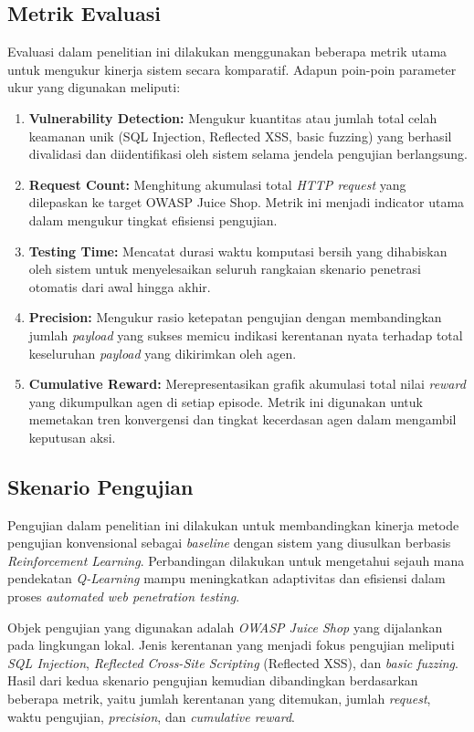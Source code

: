 \subsection{Metrik Evaluasi}

Evaluasi dalam penelitian ini dilakukan menggunakan beberapa metrik utama untuk mengukur kinerja sistem secara komparatif. Adapun poin-poin parameter ukur yang digunakan meliputi:

\begin{enumerate}
    \item \textbf{Vulnerability Detection:} Mengukur kuantitas atau jumlah total celah keamanan unik (SQL Injection, Reflected XSS, basic fuzzing) yang berhasil divalidasi dan diidentifikasi oleh sistem selama jendela pengujian berlangsung.
    \item \textbf{Request Count:} Menghitung akumulasi total \textit{HTTP request} yang dilepaskan ke target OWASP Juice Shop. Metrik ini menjadi indicator utama dalam mengukur tingkat efisiensi pengujian.
    \item \textbf{Testing Time:} Mencatat durasi waktu komputasi bersih yang dihabiskan oleh sistem untuk menyelesaikan seluruh rangkaian skenario penetrasi otomatis dari awal hingga akhir.
    \item \textbf{Precision:} Mengukur rasio ketepatan pengujian dengan membandingkan jumlah \textit{payload} yang sukses memicu indikasi kerentanan nyata terhadap total keseluruhan \textit{payload} yang dikirimkan oleh agen.
    \item \textbf{Cumulative Reward:} Merepresentasikan grafik akumulasi total nilai \textit{reward} yang dikumpulkan agen di setiap episode. Metrik ini digunakan untuk memetakan tren konvergensi dan tingkat kecerdasan agen dalam mengambil keputusan aksi.
\end{enumerate}

\subsection{Skenario Pengujian}

Pengujian dalam penelitian ini dilakukan untuk membandingkan kinerja metode pengujian konvensional sebagai \textit{baseline} dengan sistem yang diusulkan berbasis \textit{Reinforcement Learning}. Perbandingan dilakukan untuk mengetahui sejauh mana pendekatan \textit{Q-Learning} mampu meningkatkan adaptivitas dan efisiensi dalam proses \textit{automated web penetration testing}.

Objek pengujian yang digunakan adalah \textit{OWASP Juice Shop} yang dijalankan pada lingkungan lokal. Jenis kerentanan yang menjadi fokus pengujian meliputi \textit{SQL Injection}, \textit{Reflected Cross-Site Scripting} (Reflected XSS), dan \textit{basic fuzzing}. Hasil dari kedua skenario pengujian kemudian dibandingkan berdasarkan beberapa metrik, yaitu jumlah kerentanan yang ditemukan, jumlah \textit{request}, waktu pengujian, \textit{precision}, dan \textit{cumulative reward}.

